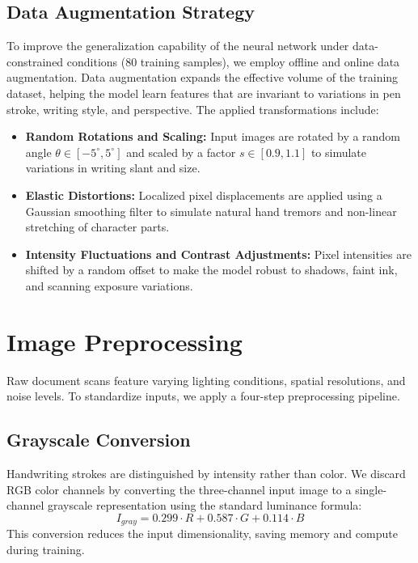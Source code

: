 \subsection{Data Augmentation Strategy}
To improve the generalization capability of the neural network under data-constrained conditions (80 training samples), we employ offline and online data augmentation. Data augmentation expands the effective volume of the training dataset, helping the model learn features that are invariant to variations in pen stroke, writing style, and perspective. The applied transformations include:
\begin{itemize}
    \item \textbf{Random Rotations and Scaling:} Input images are rotated by a random angle $\theta \in [-5^{\circ}, 5^{\circ}]$ and scaled by a factor $s \in [0.9, 1.1]$ to simulate variations in writing slant and size.
    \item \textbf{Elastic Distortions:} Localized pixel displacements are applied using a Gaussian smoothing filter to simulate natural hand tremors and non-linear stretching of character parts.
    \item \textbf{Intensity Fluctuations and Contrast Adjustments:} Pixel intensities are shifted by a random offset to make the model robust to shadows, faint ink, and scanning exposure variations.
\end{itemize}

\section{Image Preprocessing}
Raw document scans feature varying lighting conditions, spatial resolutions, and noise levels. To standardize inputs, we apply a four-step preprocessing pipeline.

\subsection{Grayscale Conversion}
Handwriting strokes are distinguished by intensity rather than color. We discard RGB color channels by converting the three-channel input image to a single-channel grayscale representation using the standard luminance formula:
\begin{equation}
    I_{gray} = 0.299 \cdot R + 0.587 \cdot G + 0.114 \cdot B
\end{equation}
This conversion reduces the input dimensionality, saving memory and compute during training.

